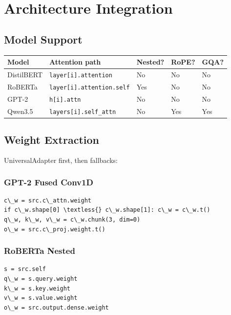 \section{Architecture Integration}

\subsection{Model Support}

\begin{table}[H]
\centering
\small
\begin{tabular}{lllll}
\toprule
\textbf{Model} & \textbf{Attention path} & \textbf{Nested?} & \textbf{RoPE?} & \textbf{GQA?} \\
\midrule
DistilBERT & \texttt{layer[i].attention} & No & No & No \\
RoBERTa & \texttt{layer[i].attention.self} & Yes & No & No \\
GPT-2 & \texttt{h[i].attn} & No & No & No \\
Qwen3.5 & \texttt{layers[i].self\_attn} & No & Yes & Yes \\
\bottomrule
\end{tabular}
\end{table}

\subsection{Weight Extraction}

UniversalAdapter first, then fallbacks:

\subsubsection{GPT-2 Fused Conv1D}

\begin{lstlisting}
c\_w = src.c\_attn.weight
if c\_w.shape[0] \textless{} c\_w.shape[1]: c\_w = c\_w.t()
q\_w, k\_w, v\_w = c\_w.chunk(3, dim=0)
o\_w = src.c\_proj.weight.t()
\end{lstlisting}

\subsubsection{RoBERTa Nested}

\begin{lstlisting}
s = src.self
q\_w = s.query.weight
k\_w = s.key.weight
v\_w = s.value.weight
o\_w = src.output.dense.weight
\end{lstlisting}

